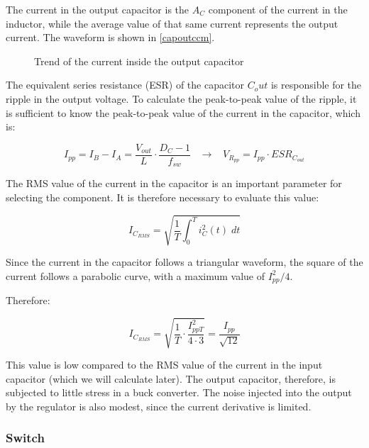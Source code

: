 \documentclass[../main.tex]{subfiles}
\begin{document}
The current in the output capacitor is the $A_C$ component of the current in the inductor, while the average value of that same current represents the output current. The waveform is shown in \autoref{capoutccm}.

\begin{figure}
\begin{center}


\label{capoutccm}
\caption{Trend of the current inside the output capacitor}	
\end{center}	
\end{figure}

The equivalent series resistance (ESR) of the capacitor $C_out$ is responsible for the ripple in the output voltage. To calculate the peak-to-peak value of the ripple, it is sufficient to know the peak-to-peak value of the current in the capacitor, which is:

\begin{equation}
	I_{pp} = I_B - I_A = \frac{V_{out}}{L} \cdot \frac{D_C - 1}{f_{sw}} \hspace{10pt} \longrightarrow \hspace{10pt} V_{R_{pp}} = I_{pp} \cdot \unit{ESR_{C_{out}}}
\end{equation}

The RMS value of the current in the capacitor is an important parameter for selecting the component. 
It is therefore necessary to evaluate this value:

\begin{equation}
	I_{C_{RMS}} = \sqrt{\frac{1}{T} \int_0^T i^2_C(t)\; dt}
\end{equation}

Since the current in the capacitor follows a triangular waveform, the square of the current follows a parabolic curve, with a maximum value of $I^2_{pp}/4$. 

Therefore:

\begin{equation}
	I_{C_{RMS}} = \sqrt{\frac{1}{T} \cdot \frac{I^2_{pp T}}{4 \cdot 3}} = \frac{I_{pp}}{\sqrt{12}}
\end{equation}

This value is low compared to the RMS value of the current in the input capacitor (which we will calculate later). The output capacitor, therefore, is subjected to little stress in a buck converter. The noise injected into the output by the regulator is also modest, since the current derivative is limited.

\subsubsection*{Switch}
\end{document}
